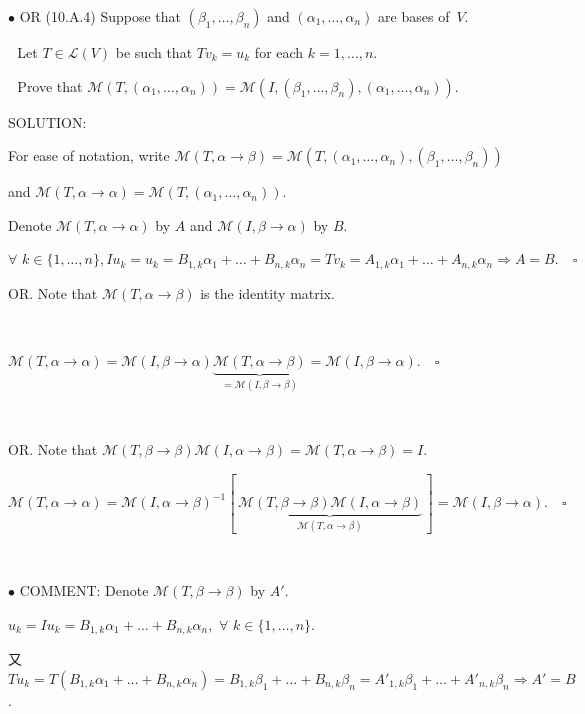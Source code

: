 \documentclass[a4paper, 11pt, UTF8]{article}
\def\Lm{\mathcal{L}}
\def\Mt{\mathcal{M}}
\begin{document}
\begin{large}
{\small $\bullet$ } O{\small R} (10.A.4) {\timessl\Large 
Suppose that $(\beta_1,\dots,\beta_n)$ and $(\alpha_1,\dots,\alpha_n)$ are bases of \,$V$.}\par\,\,
{\timessl\Large Let $T\in\Lm(V)$ be such that $Tv_k = u_k$ for each $k = 1,\dots,n$.}\par\,\,
{\timessl\Large Prove that $\Mt(T, (\alpha_1,\dots,\alpha_n))=\Mt(I,(\beta_1 ,\dots,\beta_n),(\alpha_1,\dots,\alpha_n))$}.\par
{\timesbf S\footnotesize{OLUTION:}}\par\quad
For ease of notation, write $\Mt(T,\alpha\rightarrow\beta)=\Mt(T,(\alpha_1,\dots,\alpha_n),(\beta_1,\dots,\beta_n))$\par\qquad\qquad\qquad\qquad\qquad
and $\Mt(T,\alpha\rightarrow\alpha)=\Mt(T,(\alpha_1,\dots,\alpha_n)).$\par\quad
Denote $\Mt(T, \alpha\rightarrow\alpha)$ by $A$ and $\Mt(I,\beta\rightarrow\alpha)$ by $B.$\par\quad
$\forall\,\,k\in\{1,\dots,n\},Iu_k=u_k=B_{1,k}\alpha_1+\dots+B_{n,k}\alpha_n=Tv_k=A_{1,k}\alpha_1+\dots+A_{n,k}\alpha_n\Rightarrow A=B.\quad\square$\par\quad
O{\small R}. Note that $\Mt(T,\alpha\rightarrow\beta)$ is the identity matrix.\par{\tiny\,\par}\quad
$\Mt(T,\alpha\rightarrow\alpha)=\Mt(I,\beta\rightarrow\alpha)\underbrace{\Mt(T,\alpha\rightarrow\beta)}_{=\Mt(I,\beta\rightarrow\beta)}=\Mt(I,\beta\rightarrow\alpha).\quad\square$\par{\tiny\,\par}\quad
O{\small R}. Note that $\Mt(T,\beta\rightarrow\beta)\Mt(I,\alpha\rightarrow\beta)=\Mt(T,\alpha\rightarrow\beta)=I.$\par\quad
$\Mt(T,\alpha\rightarrow\alpha)=\Mt(I,\alpha\rightarrow\beta)^{-1}[\,\underbrace{\Mt(T,\beta\rightarrow\beta)\Mt( I,\alpha\rightarrow\beta)}_{\Mt(T,\alpha\rightarrow\beta)}\,]=\Mt(I,\beta\rightarrow\alpha).\quad\square$\par{\tiny\,\par}\quad
{\small $\bullet$} C{\small OMMENT}: Denote $\Mt(T,\beta\rightarrow\beta)$ by $A'$.\par\quad
$u_k=Iu_k=B_{1,k}\alpha_1+\dots+B_{n,k}\alpha_n,\,\,\forall \,\,k\in\{1,\dots,n\}.$\par\quad
又 \,\,\,\,\,$Tu_k=T(B_{1,k}\alpha_1+\dots+B_{n,k}\alpha_n)=B_{1,k}\beta_1+\dots+B_{n,k}\beta_n=A'_{1,k}\beta_1+\dots+A'_{n,k}\beta_n\Rightarrow A'=B$.\par\quad

\end{large}
\end{document}
